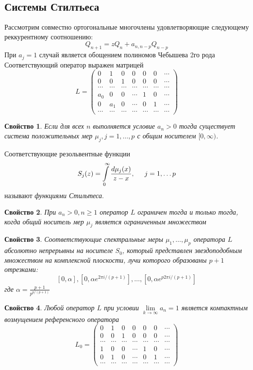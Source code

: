 \documentclass{report}
\newtheorem{prope}{Свойство} [chapter]
\begin{document}
\subsection{Системы Стилтьеса}
Рассмотрим совместно ортогональные многочлены удовлетворяющие следующему реккурентному соотношению:
$$
Q_{n+1}=zQ_n+ a_{n,n-p}Q_{n-p}
$$
При $a_j=1$ случай является обощением полиномов Чебышева 2го рода \\
Соответствующий оператор выражен матрицей
\begin{equation}
L = \left(\begin{array}{ccccccc}
0 & 1&0&0&0&0&\cdots\\
0 & 0 &1&0&0&0&\cdots\\
\cdots&\cdots&\cdots&\cdots&\cdots&\cdots&\cdots\\
a_0&0&0&\cdots&1&0&\cdots\\
0&a_1&0&\cdots&0&1&\cdots\\
\cdots&\cdots&\cdots&\cdots&\cdots&\cdots&\cdots
\end{array}\right)
\end{equation}

\begin{prope}
Если для всех $n$ выполняется условие $a_n > 0$ тогда существует система положительных мер $\mu_j, j=1,\ldots,p$ с общим носителем $[0, \infty)$. 
\end{prope}
Соответствующие резольвентные функции 
$$
S_j(z) = \int \limits_{0}^{\infty} {\displaystyle\frac{d\mu_j(x)}{z-x}}, \hspace{0.5cm} j=1, \ldots p
$$
называют \emph {функциями Стильтеса}.
\begin{prope}
При $a_n > 0, n \geq 1$ оператор $L$ ограничен тогда и только тогда, когда общий носитель мер $\mu_j$ является ограниченным множеством
\end{prope}
\begin{prope}
Соответствующие спектральные меры $\mu_1, \ldots, \mu_p$ оператора $L$ абсолютно непрерывны на носителе $S_0$, который представлен звездоподобным множеством на комплексной плоскости, лучи которого образованы $p+1$ отрезками:
$$
[0,\alpha], [0, \alpha e^{2\pi i / (p+1)}], \ldots , [0, \alpha e^{p 2\pi i /(p+1)}]
$$ 
где $\alpha=\displaystyle \frac{p+1}{p^{p/(p+1)}}$
\end{prope}
\begin{prope}
Любой оператор $L$ при условии $\lim \limits_{k \rightarrow \infty} a_n = 1$ является компактным возмущением референсного оператора
 \begin{equation}
L_0 = \left(\begin{array}{ccccccc}
0 & 1&0&0&0&0&\cdots\\
0 & 0 &1&0&0&0&\cdots\\
\cdots&\cdots&\cdots&\cdots&\cdots&\cdots&\cdots\\
1&0&0&\cdots&1&0&\cdots\\
0&1&0&\cdots&0&1&\cdots\\
\cdots&\cdots&\cdots&\cdots&\cdots&\cdots&\cdots
\end{array}\right)
\end{equation}
\end{prope}
\end{document}
